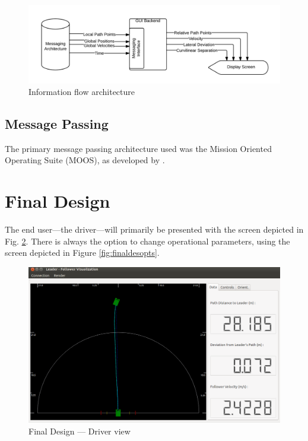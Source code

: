 \documentclass[12pt]{report}
\begin{document}
\begin{figure}[htbp]
    \centering
    \includegraphics[width=6.5in]{./figs/blackbox_flowchart.png}
    \caption{Information flow architecture}
    \label{fig:blackboxflow}
\end{figure}

\subsection{Message Passing}
The primary message passing architecture used was the Mission Oriented Operating Suite (MOOS), as developed by \cite{moos}.

\section{Final Design}
The end user---the driver---will primarily be presented with the screen depicted in Fig. \ref{fig:finaldesdriv}. There is always the option to change operational parameters, using the screen depicted in Figure \ref{fig:finaldesopts}.

\begin{figure}[htbp]
    \centering
    \includegraphics[width=6.5in]{./figs/final_design_data.png}
    \caption{Final Design --- Driver view}
    \label{fig:finaldesdriv}
\end{figure}
\end{document}
